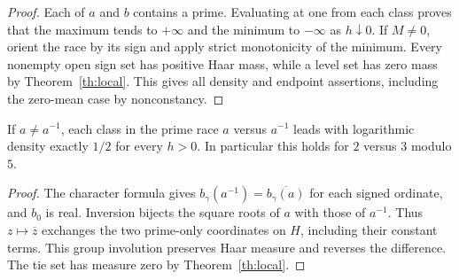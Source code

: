 \begin{proof}
Each of $a$ and $b$ contains a prime. Evaluating at one from each
class proves that the maximum tends to $+\infty$ and the minimum
to $-\infty$ as $h\downarrow0$. If $M\ne0$, orient the race by its
sign and apply strict monotonicity of the minimum. Every nonempty open
sign set has positive Haar mass, while a level set has zero mass by
Theorem~\ref{th:local}. This gives all density and endpoint assertions,
including the zero-mean case by nonconstancy.
\end{proof}

\begin{corollary}\label{cor:inversion}
If $a\ne a^{-1}$, each class in the prime race $a$ versus $a^{-1}$
leads with logarithmic density exactly $1/2$ for every $h>0$.
In particular this holds for $2$ versus $3$ modulo $5$.
\end{corollary}
\begin{proof}
The character formula gives
$b_\gamma(a^{-1})=\overline{b_\gamma(a)}$ for each signed ordinate,
and $b_0$ is real. Inversion bijects the square roots of $a$ with
those of $a^{-1}$. Thus $z\mapsto\overline z$ exchanges the two
prime-only coordinates on $H$, including their constant terms.
This group involution preserves Haar measure and reverses the
difference. The tie set has measure zero by Theorem~\ref{th:local}.
\end{proof}
